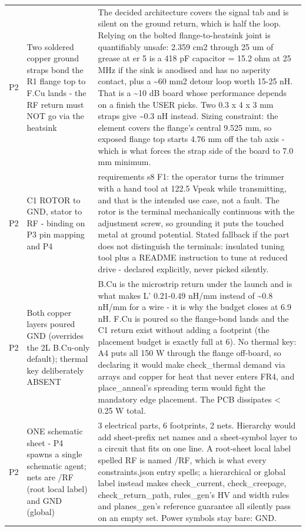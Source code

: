 \documentclass[11pt,a4paper]{article}
\begin{document}
{\begin{longtable}{lp{5.2cm}p{7.2cm}}
P2 & Two soldered copper ground straps bond the R1 flange top to F.Cu lands - the RF return must NOT go via the heatsink & The decided architecture covers the signal tab and is silent on the ground return, which is half the loop. Relying on the bolted flange-to-heatsink joint is quantifiably unsafe: 2.359 cm2 through 25 um of grease at er 5 is a 418 pF capacitor = 15.2 ohm at 25 MHz if the sink is anodised and has no asperity contact, plus a \textasciitilde{}60 mm2 detour loop worth 15-25 nH. That is a \textasciitilde{}10 dB board whose performance depends on a finish the USER picks. Two 0.3 x 4 x 3 mm straps give \textasciitilde{}0.3 nH instead. Sizing constraint: the element covers the flange's central 9.525 mm, so exposed flange top starts 4.76 mm off the tab axis - which is what forces the strap side of the board to 7.0 mm minimum. \\
P2 & C1 ROTOR to GND, stator to RF - binding on P3 pin mapping and P4 & requirements s8 F1: the operator turns the trimmer with a hand tool at 122.5 Vpeak while transmitting, and that is the intended use case, not a fault. The rotor is the terminal mechanically continuous with the adjustment screw, so grounding it puts the touched metal at ground potential. Stated fallback if the part does not distinguish the terminals: insulated tuning tool plus a README instruction to tune at reduced drive - declared explicitly, never picked silently. \\
P2 & Both copper layers poured GND (overrides the 2L B.Cu-only default); thermal key deliberately ABSENT & B.Cu is the microstrip return under the launch and is what makes L' 0.21-0.49 nH/mm instead of \textasciitilde{}0.8 nH/mm for a wire - it is why the budget closes at 6.9 nH. F.Cu is poured so the flange-bond lands and the C1 return exist without adding a footprint (the placement budget is exactly full at 6). No thermal key: A4 puts all 150 W through the flange off-board, so declaring it would make check\_thermal demand via arrays and copper for heat that never enters FR4, and place\_anneal's spreading term would fight the mandatory edge placement. The PCB dissipates \textless{} 0.25 W total. \\
P2 & ONE schematic sheet - P4 spawns a single schematic agent; nets are /RF (root local label) and GND (global) & 3 electrical parts, 6 footprints, 2 nets. Hierarchy would add sheet-prefix net names and a sheet-symbol layer to a circuit that fits on one line. A root-sheet local label spelled RF is named /RF, which is what every constraints.json entry spells; a hierarchical or global label instead makes check\_current, check\_creepage, check\_return\_path, rules\_gen's HV and width rules and planes\_gen's reference guarantee all silently pass on an empty set. Power symbols stay bare: GND. \\

\end{longtable}}
\end{document}
